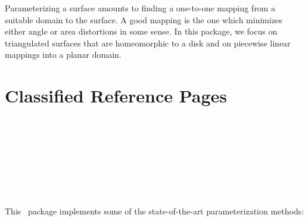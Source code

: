 
\label{chap:surface_mesh_parameterization_ref}


Parameterizing a surface amounts to finding a one-to-one mapping from
a suitable domain to the surface. A good mapping is the one which
minimizes either angle or area distortions in some sense. In this
package, we focus on triangulated surfaces that are homeomorphic to a
disk and on piecewise linear mappings into a planar domain.



\section{Classified Reference Pages}


  \\



  \\
  \\
  \\
  \\
  \\



This \cgal\ package implements some of
the state-of-the-art parameterization methods:

